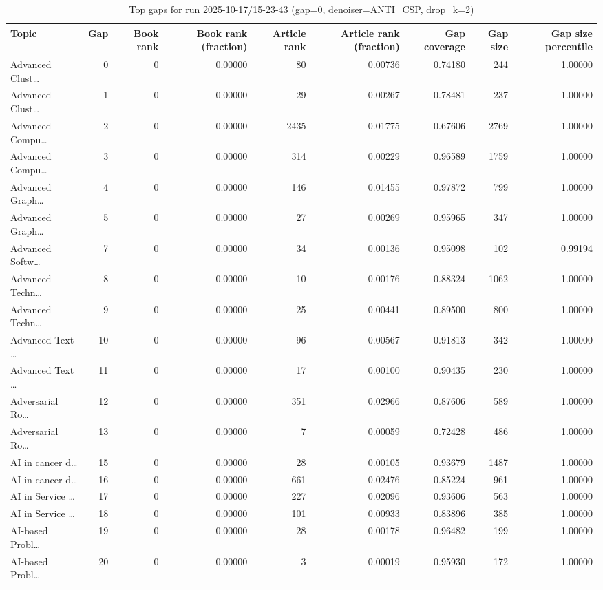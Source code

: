 \begin{table}
\caption{Top gaps for run 2025-10-17/15-23-43 (gap=0, denoiser=ANTI\_CSP, drop\_k=2)}
\label{tab:best_run_gap0_2025_10_17_15_23_43}
\begin{tabular}{lrrrrrrrr}
\toprule
Topic & Gap & Book rank & Book rank (fraction) & Article rank & Article rank (fraction) & Gap coverage & Gap size & Gap size percentile \\
\midrule
Advanced Clust… & 0 & 0 & 0.00000 & 80 & 0.00736 & 0.74180 & 244 & 1.00000 \\
Advanced Clust… & 1 & 0 & 0.00000 & 29 & 0.00267 & 0.78481 & 237 & 1.00000 \\
Advanced Compu… & 2 & 0 & 0.00000 & 2435 & 0.01775 & 0.67606 & 2769 & 1.00000 \\
Advanced Compu… & 3 & 0 & 0.00000 & 314 & 0.00229 & 0.96589 & 1759 & 1.00000 \\
Advanced Graph… & 4 & 0 & 0.00000 & 146 & 0.01455 & 0.97872 & 799 & 1.00000 \\
Advanced Graph… & 5 & 0 & 0.00000 & 27 & 0.00269 & 0.95965 & 347 & 1.00000 \\
Advanced Softw… & 7 & 0 & 0.00000 & 34 & 0.00136 & 0.95098 & 102 & 0.99194 \\
Advanced Techn… & 8 & 0 & 0.00000 & 10 & 0.00176 & 0.88324 & 1062 & 1.00000 \\
Advanced Techn… & 9 & 0 & 0.00000 & 25 & 0.00441 & 0.89500 & 800 & 1.00000 \\
Advanced Text … & 10 & 0 & 0.00000 & 96 & 0.00567 & 0.91813 & 342 & 1.00000 \\
Advanced Text … & 11 & 0 & 0.00000 & 17 & 0.00100 & 0.90435 & 230 & 1.00000 \\
Adversarial Ro… & 12 & 0 & 0.00000 & 351 & 0.02966 & 0.87606 & 589 & 1.00000 \\
Adversarial Ro… & 13 & 0 & 0.00000 & 7 & 0.00059 & 0.72428 & 486 & 1.00000 \\
AI in cancer d… & 15 & 0 & 0.00000 & 28 & 0.00105 & 0.93679 & 1487 & 1.00000 \\
AI in cancer d… & 16 & 0 & 0.00000 & 661 & 0.02476 & 0.85224 & 961 & 1.00000 \\
AI in Service … & 17 & 0 & 0.00000 & 227 & 0.02096 & 0.93606 & 563 & 1.00000 \\
AI in Service … & 18 & 0 & 0.00000 & 101 & 0.00933 & 0.83896 & 385 & 1.00000 \\
AI-based Probl… & 19 & 0 & 0.00000 & 28 & 0.00178 & 0.96482 & 199 & 1.00000 \\
AI-based Probl… & 20 & 0 & 0.00000 & 3 & 0.00019 & 0.95930 & 172 & 1.00000 \\

\end{tabular}
\end{table}
